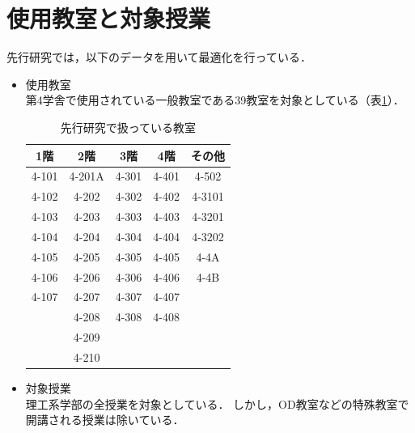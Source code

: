 \documentclass[12pt, a4paper, fleqn]{jreport}
\begin{document}
\section{使用教室と対象授業}
先行研究では，以下のデータを用いて最適化を行っている．
\begin{itemize}
\item 使用教室\\
第4学舎で使用されている一般教室である39教室を対象としている（表\ref{senkoukyousitu}）．
\begin{table}[!h]
\begin{center}
\caption{先行研究で扱っている教室}
\label{senkoukyousitu}
\begin{tabular}{|c|c|c|c|c|}
\hline
1階 & 2階 & 3階 & 4階 & その他\\
\hline\hline
4-101  &   4-201A & 4-301  &  4-401  &  4-502 \\
4-102  &   4-202  & 4-302  &  4-402  &  4-3101\\
4-103  &   4-203  & 4-303  &  4-403  &  4-3201\\
4-104  &   4-204  & 4-304  &  4-404  &  4-3202\\
4-105  &   4-205  & 4-305  &  4-405  &  4-4A  \\
4-106  &   4-206  & 4-306  &  4-406  &  4-4B  \\
4-107  &   4-207  & 4-307  &  4-407  &        \\
       &   4-208  & 4-308  &  4-408  &        \\
       &   4-209  &        &         &        \\
       &   4-210  &        &         &        \\
\hline
\end{tabular}
\end{center}
\end{table}

\item 対象授業\\
理工系学部の全授業を対象としている．
しかし，OD教室などの特殊教室で開講される授業は除いている．
\end{itemize}
\end{document}
